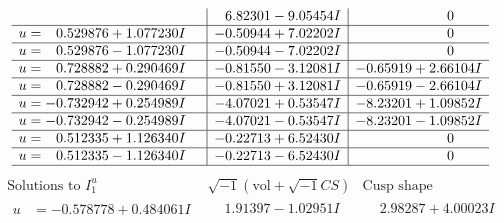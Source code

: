 \documentclass[1p]{elsarticle_modified}
\theoremstyle{definition}
\newcommand{\I}{\sqrt{-1}}
\begin{document}
$$\begin{array}{c|c|c}
 & \phantom{-}6.82301 - 9.05454 I & \phantom{-0.000000 } 0 \\ \hline\begin{aligned}
u &= \phantom{-}0.529876 + 1.077230 I\end{aligned}
 & -0.50944 + 7.02202 I & \phantom{-0.000000 } 0 \\ \hline\begin{aligned}
u &= \phantom{-}0.529876 - 1.077230 I\end{aligned}
 & -0.50944 - 7.02202 I & \phantom{-0.000000 } 0 \\ \hline\begin{aligned}
u &= \phantom{-}0.728882 + 0.290469 I\end{aligned}
 & -0.81550 - 3.12081 I & -0.65919 + 2.66104 I \\ \hline\begin{aligned}
u &= \phantom{-}0.728882 - 0.290469 I\end{aligned}
 & -0.81550 + 3.12081 I & -0.65919 - 2.66104 I \\ \hline\begin{aligned}
u &= -0.732942 + 0.254989 I\end{aligned}
 & -4.07021 + 0.53547 I & -8.23201 + 1.09852 I \\ \hline\begin{aligned}
u &= -0.732942 - 0.254989 I\end{aligned}
 & -4.07021 - 0.53547 I & -8.23201 - 1.09852 I \\ \hline\begin{aligned}
u &= \phantom{-}0.512335 + 1.126340 I\end{aligned}
 & -0.22713 + 6.52430 I & \phantom{-0.000000 } 0 \\ \hline\begin{aligned}
u &= \phantom{-}0.512335 - 1.126340 I\end{aligned}
 & -0.22713 - 6.52430 I & \phantom{-0.000000 } 0\\
 \hline 
 \end{array}$$\newpage$$\begin{array}{c|c|c}  
\text{Solutions to }I^u_{1}& \I (\text{vol} + \sqrt{-1}CS) & \text{Cusp shape}\\
 \hline 
\begin{aligned}
u &= -0.578778 + 0.484061 I\end{aligned}
 & \phantom{-}1.91397 - 1.02951 I & \phantom{-}2.98287 + 4.00023 I \\ \hline\begin{aligned}

\end{aligned}
\end{array}$$
\end{document}
